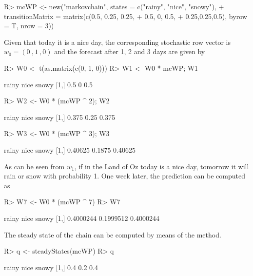 \documentclass[nojss]{jss}
\begin{document}
\begin{Schunk}
\begin{Sinput}
R> mcWP <- new("markovchain", states = c("rainy", "nice", "snowy"),
+           transitionMatrix = matrix(c(0.5, 0.25, 0.25,
+                                     0.5, 0, 0.5,
+                                     0.25,0.25,0.5), byrow = T, nrow = 3))
\end{Sinput}
\end{Schunk}

Given that today it is a nice day, the corresponding stochastic row vector is
$w_{0}=(0\:,1\:,0)$ and the forecast after 1, 2 and 3 days are given by

\begin{Schunk}
\begin{Sinput}
R> W0 <- t(as.matrix(c(0, 1, 0)))
R> W1 <- W0 * mcWP; W1
\end{Sinput}
\begin{Soutput}
     rainy nice snowy
[1,]   0.5    0   0.5
\end{Soutput}
\begin{Sinput}
R> W2 <- W0 * (mcWP ^ 2); W2
\end{Sinput}
\begin{Soutput}
     rainy nice snowy
[1,] 0.375 0.25 0.375
\end{Soutput}
\begin{Sinput}
R> W3 <- W0 * (mcWP ^ 3); W3
\end{Sinput}
\begin{Soutput}
       rainy   nice   snowy
[1,] 0.40625 0.1875 0.40625
\end{Soutput}
\end{Schunk}

As can be seen from $w_{1}$, if in the Land of Oz today is a nice day, tomorrow it will rain or snow with probability 1. One week later, the prediction can be computed as

\begin{Schunk}
\begin{Sinput}
R> W7 <- W0 * (mcWP ^ 7)
R> W7
\end{Sinput}
\begin{Soutput}
         rainy      nice     snowy
[1,] 0.4000244 0.1999512 0.4000244
\end{Soutput}
\end{Schunk}

The steady state of the chain can be computed by means of the  method.

\begin{Schunk}
\begin{Sinput}
R> q <- steadyStates(mcWP)
R> q
\end{Sinput}
\begin{Soutput}
     rainy nice snowy
[1,]   0.4  0.2   0.4
\end{Soutput}
\end{Schunk}
\end{document}
